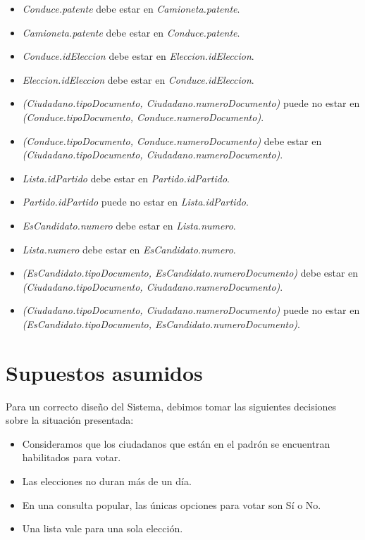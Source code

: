 \documentclass[10pt,a4paper]{article}
\begin{document}
\begin{itemize}
\item \textit{Conduce.patente} debe estar en \textit{Camioneta.patente}.

\item \textit{Camioneta.patente} debe estar en \textit{Conduce.patente}.

\item \textit{Conduce.idEleccion} debe estar en \textit{Eleccion.idEleccion}.

\item \textit{Eleccion.idEleccion} debe estar en \textit{Conduce.idEleccion}.

\item \textit{(Ciudadano.tipoDocumento, Ciudadano.numeroDocumento)} puede no estar en \textit{(Conduce.tipoDocumento, Conduce.numeroDocumento)}.

\item \textit{(Conduce.tipoDocumento, Conduce.numeroDocumento)} debe estar en \textit{(Ciudadano.tipoDocumento, Ciudadano.numeroDocumento)}.

\item \textit{Lista.idPartido} debe estar en \textit{Partido.idPartido}.

\item \textit{Partido.idPartido} puede no estar en \textit{Lista.idPartido}.

\item \textit{EsCandidato.numero} debe estar en \textit{Lista.numero}.

\item \textit{Lista.numero} debe estar en \textit{EsCandidato.numero}.

\item \textit{(EsCandidato.tipoDocumento, EsCandidato.numeroDocumento)} debe estar en \textit{(Ciudadano.tipoDocumento, Ciudadano.numeroDocumento)}.

\item \textit{(Ciudadano.tipoDocumento, Ciudadano.numeroDocumento)} puede no estar en \textit{(EsCandidato.tipoDocumento, EsCandidato.numeroDocumento)}.

\end{itemize}
\newpage
\section{Supuestos asumidos}
Para un correcto diseño del Sistema, debimos tomar las siguientes decisiones sobre la situación presentada:
\begin{itemize}
\item Consideramos que los ciudadanos que están en el padrón se encuentran habilitados para votar.
\item Las elecciones no duran más de un día.
\item En una consulta popular, las únicas opciones para votar son Sí o No.
\item Una lista vale para una sola elección.
\end{itemize}
\newpage
\end{document}
